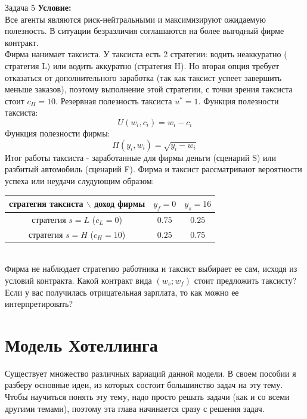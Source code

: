 \begin{mybox}{Задача 5}
    \indent\setlength{\parindent}{1em}\textbf{Условие:}\\
    \indent\setlength{\parindent}{1em}Все агенты являются риск-нейтральными и максимизируют ожидаемую полезность. В
    ситуации безразличия соглашаются на более выгодный фирме контракт.\\
    \indent\setlength{\parindent}{1em}Фирма нанимает таксиста. У таксиста есть 2 стратегии: водить неаккуратно (
    стратегия L) или водить аккуратно (стратегия H). Но вторая опция
    требует отказаться от дополнительного заработка (так как таксист успеет завершить меньше заказов), поэтому
    выполнение этой стратегии, с точки зрения таксиста
    стоит $c_H=10$. Резервная полезность таксиста $u^*=1$. Функция полезности таксиста: $$U(w_i,c_i)=w_i-c_i$$
    \indent\setlength{\parindent}{1em}Функция полезности фирмы: $$\Pi(y_i,w_i)=\sqrt{y_i-w_i}$$
    \indent\setlength{\parindent}{1em}Итог работы таксиста - заработанные для фирмы деньги (сценарий
    S) или разбитый автомобиль (сценарий F). Фирма и таксист рассматривают вероятности успеха или неудачи слудующим
    образом:
    \\\begin{center}
        \begin{tabular}{ c|c|c }
             стратегия таксиста $\backslash$ доход фирмы & $y_f=0$ & $y_s=16$ \\
             \hline
             стратегия $s=L$ ($c_L=0$) & $0.75$ & $0.25$ \\
             \hline
             стратегия $s=H$ ($c_H=10$) & $0.25$ & $0.75$ \\
        \end{tabular}
    \end{center}\\
    \indent\setlength{\parindent}{1em}Фирма не наблюдает стратегию работника и таксист
    выбирает ее сам, исходя из условий контракта. Какой контракт вида $(w_s;w_f)$ стоит предложить таксисту? Если у
    вас получилась отрицательная зарплата, то как можно ее интерпретировать?\\
\end{mybox}



\chapter{Модель Хотеллинга}

\indent\setlength{\parindent}{1em}\indent\setlength{\parindent}{1em}Существует множество различных вариаций данной
модели. В своем пособии я разберу основные идеи, из которых состоит большинство задач на эту тему. Чтобы научиться
понять эту тему, надо просто решать задачи (как и со всеми другими темами), поэтому эта глава начинается сразу с
решения задач.


